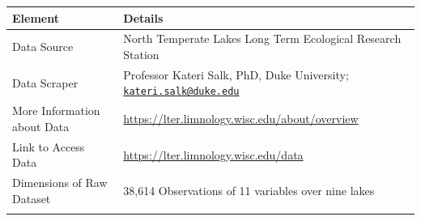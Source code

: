 \documentclass[12pt,]{article}
\begin{document}
\begin{longtable}[]{@{}ll@{}}
\toprule
\begin{minipage}[b]{0.33\columnwidth}\raggedright\strut
Element\strut
\end{minipage} & \begin{minipage}[b]{0.61\columnwidth}\raggedright\strut
Details\strut
\end{minipage}\tabularnewline
\midrule
\endhead
\begin{minipage}[t]{0.33\columnwidth}\raggedright\strut
Data Source\strut
\end{minipage} & \begin{minipage}[t]{0.61\columnwidth}\raggedright\strut
North Temperate Lakes Long Term Ecological Research Station\strut
\end{minipage}\tabularnewline
\begin{minipage}[t]{0.33\columnwidth}\raggedright\strut
Data Scraper\strut
\end{minipage} & \begin{minipage}[t]{0.61\columnwidth}\raggedright\strut
Professor Kateri Salk, PhD, Duke University;
\href{mailto:kateri.salk@duke.edu}{\nolinkurl{kateri.salk@duke.edu}}\strut
\end{minipage}\tabularnewline
\begin{minipage}[t]{0.33\columnwidth}\raggedright\strut
More Information about Data\strut
\end{minipage} & \begin{minipage}[t]{0.61\columnwidth}\raggedright\strut
\url{https://lter.limnology.wisc.edu/about/overview}\strut
\end{minipage}\tabularnewline
\begin{minipage}[t]{0.33\columnwidth}\raggedright\strut
Link to Access Data\strut
\end{minipage} & \begin{minipage}[t]{0.61\columnwidth}\raggedright\strut
\url{https://lter.limnology.wisc.edu/data}\strut
\end{minipage}\tabularnewline
\begin{minipage}[t]{0.33\columnwidth}\raggedright\strut
Dimensions of Raw Dataset\strut
\end{minipage} & \begin{minipage}[t]{0.61\columnwidth}\raggedright\strut
38,614 Observations of 11 variables over nine lakes\strut
\end{minipage}\tabularnewline
\begin{minipage}[t]{0.33\columnwidth}\raggedright\strut

\end{minipage}
\end{longtable}
\end{document}
